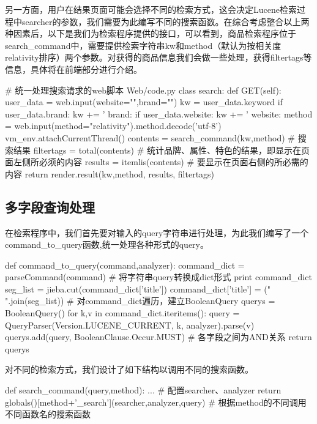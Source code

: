 另一方面，用户在结果页面可能会选择不同的检索方式，这会决定Lucene检索过程中searcher的参数，我们需要为此编写不同的搜索函数。在综合考虑整合以上两种因素后，以下是我们为检索程序提供的接口，可以看到，商品检索程序位于search\_command中，需要提供检索字符串kw和method（默认为按相关度relativity排序）两个参数。对获得的商品信息我们会做一些处理，获得filtertags等信息，具体将在前端部分进行介绍。

\begin{python}
# 统一处理搜索请求的web脚本 Web/code.py
class search:
    def GET(self):
        user_data = web.input(website="",brand="")
        kw = user_data.keyword
        if user_data.brand:
            kw += ' brand:%
        if user_data.website:
            kw += ' website:%
        method = web.input(method="relativity").method.decode('utf-8')
        vm_env.attachCurrentThread()
        contents = search_command(kw,method)     # 搜索结果
        filtertags = total(contents)           # 统计品牌、属性、特色的结果，即显示在页面左侧所必须的内容
        results = itemlis(contents)            # 要显示在页面右侧的所必需的内容
        return render.result(kw,method, results, filtertags)
\end{python}

\subsection{多字段查询处理}

在检索程序中，我们首先要对输入的query字符串进行处理，为此我们编写了一个command\_to\_query函数,统一处理各种形式的query。

\begin{python}
def command_to_query(command,analyzer):
    command_dict = parseCommand(command)          # 将字符串query转换成dict形式
    print command_dict
    seg_list = jieba.cut(command_dict['title'])
    command_dict['title'] = (" ".join(seg_list))  # 对command_dict遍历，建立BooleanQuery
    querys = BooleanQuery()
    for k,v in command_dict.iteritems():
        query = QueryParser(Version.LUCENE_CURRENT, k,
                            analyzer).parse(v)
        querys.add(query, BooleanClause.Occur.MUST)  # 各字段之间为AND关系
    return querys
\end{python}

对不同的检索方式，我们设计了如下结构以调用不同的搜索函数。
\begin{python}
def search_command(query,method):
    ... # 配置searcher、analyzer
    return globals()[method+'_search'](searcher,analyzer,query)
    # 根据method的不同调用不同函数名的搜索函数
\end{python}

